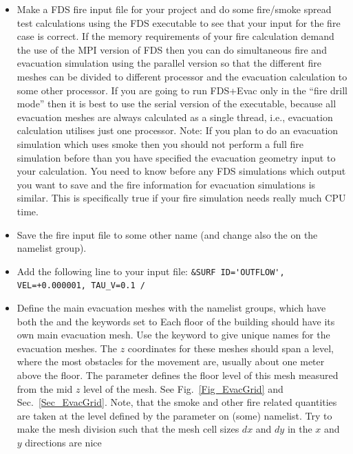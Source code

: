 \documentclass[12pt,a4paper,final,twoside]{stylevk}
\begin{document}
\begin{itemize}
%
\item Make a FDS fire input file for your project and do some
  fire/smoke spread test calculations using the FDS executable to see
  that your input for the fire case is correct.  If the memory
  requirements of your fire calculation demand the use of the MPI
  version of FDS then you can do simultaneous fire and evacuation
  simulation using the parallel version so that the different fire
  meshes can be divided to different processor and the evacuation
  calculation to some other processor.  If you are going to run
  FDS+Evac only in the ``fire drill mode'' then it is best to use the
  serial version of the executable, because all evacuation meshes are
  always calculated as a single thread, i.e., evacuation
  calculation utilises just one processor.  Note: If you plan to do an
  evacuation simulation which uses smoke then you should not perform a
  full fire simulation before than you have specified the evacuation
  geometry input to your calculation.  You need to know before any FDS
  simulations which output you want to save and the fire information
  for evacuation simulations is similar.  This is specifically true if
  your fire simulation needs really much CPU time.
%
\item Save the fire input file to some other name (and change also the
   on the  namelist group).
%
\item Add the following line to your input file:\newline
  \verb|&SURF ID='OUTFLOW', VEL=+0.000001, TAU_V=0.1 /| 
%
\item Define the main evacuation meshes with the  namelist
  groups, which have both the  and the
   keywords set to   Each floor of the
  building should have its own main evacuation mesh.  Use the
   keyword to give unique names for the evacuation meshes.
  The $z$ coordinates for these meshes should span a level, where the
  most obstacles for the movement are, usually about one meter above
  the floor.  The  parameter defines the floor
  level of this mesh measured from the mid $z$ level of the mesh.  See
  Fig.~\ref{Fig_EvacGrid} and Sec.~\ref{Sec_EvacGrid}.  Note, that
  the smoke and other fire related quantities are taken at the level
  defined by the  parameter on (some)
   namelist.  Try to make the mesh division such that the
  mesh cell sizes $dx$ and $dy$ in the $x$ and $y$ directions are nice

\end{itemize}
\end{document}

